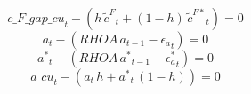 \begin{dmath}
{c\_F\_gap\_cu}_{t}-\left({{h}}\, {{\tilde c^F}}_{t}+\left(1-{{h}}\right)\, {{\tilde c^{F*}}}_{t}\right)=0
\end{dmath}
\begin{dmath}
{{a}}_{t}-\left({RHOA}\, {{a}}_{t-1}-{{\epsilon_a}}_{t}\right)=0
\end{dmath}
\begin{dmath}
{{a^*}}_{t}-\left({RHOA}\, {{a^*}}_{t-1}-{{\epsilon_a^*}}_{t}\right)=0
\end{dmath}
\begin{dmath}
{a\_cu}_{t}-\left({{a}}_{t}\, {{h}}+{{a^*}}_{t}\, \left(1-{{h}}\right)\right)=0
\end{dmath}
